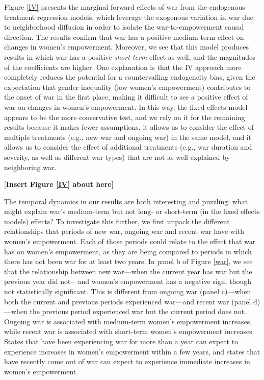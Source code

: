 \documentclass [12pt] {article}
\begin{document}
Figure \ref{IV} presents the marginal forward effects of war from the endogenous treatment regression models, which leverage the exogenous variation in war due to neighborhood diffusion in order to isolate the war-to-empowerment causal direction. The results confirm that war has a positive medium-term effect on changes in women's empowerment. Moreover, we see that this model produces results in which war has a positive \emph{short-term} effect as well, and the magnitudes of the coefficients are higher. One explanation is that the IV approach more completely reduces the potential for a countervailing endogeneity bias, given the expectation that gender inequality (low women's empowerment) contributes to the onset of war in the first place, making it difficult to see a positive effect of war on changes in women's empowerment. In this way, the fixed effects model appears to be the more conservative test, and we rely on it for the remaining results because it makes fewer assumptions, it allows us to consider the effect of multiple treatments (e.g., new war and ongoing war) in the same model, and it allows us to consider the effect of additional treatments (e.g., war duration and severity, as well as different war types) that are not as well explained by neighboring war.\\

\begin{center}
[\bf Insert Figure \ref{IV} about here]
\end{center}
\vspace*{.2in}

The temporal dynamics in our results are both interesting and puzzling: what might explain war's medium-term but not long- or short-term (in the fixed effects models) effects? To investigate this further, we first unpack the different relationships that periods of new war, ongoing war and recent war have with women's empowerment. Each of those periods could relate to the effect that war has on women's empowerment, as they are being compared to periods in which there has not been war for at least two years. In panel b of Figure \ref{war}, we see that the relationship between new war---when the current year has war but the previous year did not---and women's empowerment has a negative sign, though not statistically significant. This is different from ongoing war (panel c)---when both the current and previous periods experienced war---and recent war (panel d)---when the previous period experienced war but the current period does not. Ongoing war is associated with medium-term women's empowerment increases, while recent war is associated with short-term women's empowerment increases. States that have been experiencing war for more than a year can expect to experience increases in women's empowerment within a few years, and states that have recently come out of war can expect to experience immediate increases in women's empowerment. \\
\end{document}
